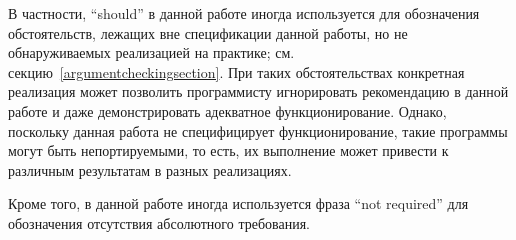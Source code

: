 В частности, ``should'' в данной работе иногда используется для обозначения обстоятельств,
лежащих вне спецификации данной работы, но не обнаруживаемых реализацией на практике;
см. секцию~\ref{argumentcheckingsection}. При таких обстоятельствах конкретная реализация может
позволить программисту игнорировать рекомендацию в данной работе и даже демонстрировать
адекватное функционирование. Однако, поскольку данная работа не специфицирует функционирование,
такие программы могут быть непортируемыми, то есть, их выполнение может привести к различным
результатам в разных реализациях.

\newpage

Кроме того, в данной работе иногда используется фраза ``not required'' для обозначения
отсутствия абсолютного требования.

